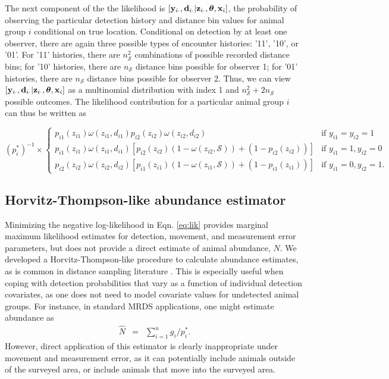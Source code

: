 \documentclass[12pt,fleqn]{article}
\begin{document}
The next component of the the likelihood is $[{\bf y}_{i \cdot},{\bf d}_{i \cdot}|{\bf z}_{i \cdot} , \boldsymbol{\theta} , {\bf x}_i]$, the probability of observing the particular detection history and distance bin values for animal group $i$ conditional on true location.  Conditional on detection by at least one observer, there are again three possible types of encounter histories: '11', '10', or '01'.  For '11' histories, there are $n_\mathcal{S}^2$ combinations of possible recorded distance bins; for '10' histories, there are $n_\mathcal{S}$ distance bins possible for observer 1; for '01' histories, there are $n_\mathcal{S}$ distance bins possible for observer 2.  Thus, we can view $[{\bf y}_{i \cdot},{\bf d}_{i \cdot}|{\bf z}_{i \cdot} , \boldsymbol{\theta} , {\bf x}_i]$ as a multinomial distribution with index 1 and $n_\mathcal{S}^2 + 2 n_\mathcal{S}$ possible outcomes. The likelihood contribution for a particular animal group $i$ can thus be written as
\begin{linenomath}
\begin{equation*}
    \label{eq:obsmod}
    (p_i^*)^{-1} \times  \left\{ \begin{array}{rl}
    p_{i1}(z_{i1}) \omega(z_{i1},d_{i1}) p_{i2}(z_{i2}) \omega(z_{i2},d_{i2}) & \text{if }y_{i1}=y_{i2}=1 \\
    p_{i1}(z_{i1})\omega(z_{i1},d_{i1}) \left[
    p_{i2}(z_{i2})(1-\omega(z_{i2},\mathcal{S}))+(1-p_{i2}(z_{i2})) \right] &  \text{if } y_{i1}=1, y_{i2}=0 \\
    p_{i2}(z_{i2})\omega(z_{i2},d_{i2}) \left[
    p_{i1}(z_{i1})(1-\omega(z_{i1},\mathcal{S}))+(1-p_{i1}(z_{i1})) \right]
                                     &  \text{if } y_{i1}=0, y_{i2}=1.
                                    \end{array} \right.
\end{equation*}
\end{linenomath}

\subsection{Horvitz-Thompson-like abundance estimator}

Minimizing the negative log-likelihood in Eqn. \ref{eq:lik} provides marginal maximum likelihood estimates for detection, movement, and measurement error parameters, but does not provide a direct estimate of animal abundance, $N$.  We developed a Horvitz-Thompson-like procedure to calculate abundance estimates, as is common in distance sampling literature \citep[see e.g.][]{BucklandEtAl2004}.  This is especially useful when coping with detection probabilities that vary as a function of individual detection covariates, as one does not need to model covariate values for undetected animal groups.  For instance, in standard MRDS applications, one might estimate abundance as
\begin{eqnarray*}
  \hat{N} & = & \sum_{i=1}^n g_i / p_i^*.
\end{eqnarray*}
However, direct application of this estimator is clearly inappropriate under movement and measurement error, as it can potentially include animals outside of the surveyed area, or include animals that move into the surveyed area.
\end{document}
